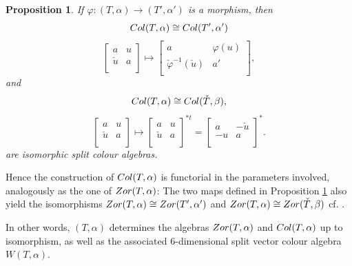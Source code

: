 \documentclass[10pt]{amsart}
\theoremstyle{plain}
\newtheorem{proposition}[theorem]{Proposition}
\theoremstyle{definition}
\begin{document}
 \begin{proposition}\label{prop:diagiso}
 If  $ \varphi:(T,\alpha)\rightarrow (T',\alpha') $
 is a morphism,  then
 $${\rm Col}( T,\alpha)\cong {\rm Col}( T',\alpha')$$
$$
\left [\begin {array}{cc}
 a & u\\
\check{u}  &  a \\
\end {array}\right ] \mapsto
\left [\begin {array}{cc}
 a & \varphi(u)\\
\check{ \varphi}^{-1}(\check{u})  &  a' \\
\end {array}\right ],
$$
and
$${\rm Col}( T,\alpha)\cong {\rm Col}(\check{T},\beta),$$
 $$
\left [\begin {array}{cc}
 a & u\\
\check{u}  &  a \\
\end {array}\right ] \mapsto
\left [\begin {array}{cc}
 a & u\\
\check{u}  &  a \\
\end {array}\right ]^{*t}
=
\left [\begin {array}{cc}
 a & - \check{u}\\
-u &  a \\
\end {array}\right ]^*.
$$
are isomorphic split colour algebras.
\end{proposition}

Hence the construction of ${\rm Col}( T,\alpha)$ is functorial in the parameters involved, analogously as the one of ${\rm Zor}(T,\alpha)$:  The two maps defined in Proposition \ref{prop:diagiso} also yield the  isomorphisms
${\rm Zor}(T,\alpha)\cong {\rm Zor}(T',\alpha')$ and $ {\rm Zor}(T,\alpha)\cong {\rm Zor}(\check{T},\beta)$
 cf. \cite[3.4]{P2}.

In other words, $(T,\alpha)$  determines the  algebras ${\rm Zor}(T,\alpha)$ and ${\rm Col}(T,\alpha)$ up to isomorphism, as well as
 the associated 6-dimensional split vector colour algebra $W(T,\alpha)$.
\end{document}
